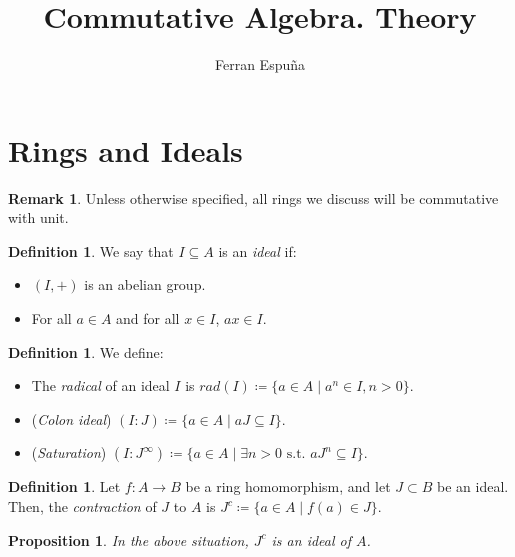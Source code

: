 \documentclass[11pt]{article}
\title{Commutative Algebra. Theory}
\author{Ferran Espuña}
\newtheorem{prop}[theorem]{Proposition}
\theoremstyle{definition}
\newtheorem{defn}[theorem]{Definition}
\newtheorem{rk}[theorem]{Remark}
\begin{document}
    \maketitle

    \section{Rings and Ideals}\label{sec:rings-and-ideals}

        \begin{rk}
            Unless otherwise specified, all rings we discuss will be commutative with unit.
        \end{rk}

        \begin{defn}
            We say that $I \subseteq A$ is an \emph{ideal} if:
            \begin{itemize}
                \item $(I,+)$ is an abelian group.
                \item For all $a \in A$ and for all $x\in I$, $ax \in I$.
            \end{itemize}
        \end{defn}

        \begin{defn}
            We define:
            \begin{itemize}
                \item The \emph{radical} of an ideal $I$ is $rad(I) \coloneqq \{a \in A \mid a^{n} \in I, n > 0\}$.
                \item (\emph{Colon ideal}) $(I:J) \coloneqq \{a \in A \mid aJ \subseteq I\}$.
                \item (\emph{Saturation}) $(I:J^{\infty}) \coloneqq \{a \in A \mid \exists n > 0 \text{ s.t. } a J^n \subseteq I\}$.
            \end{itemize}
        \end{defn}

        \begin{defn}
            Let $f: A \rightarrow B$ be a ring homomorphism, and let $J \subset B$ be an ideal.
            Then, the \emph{contraction} of $J$ to $A$ is $J^{c} \coloneqq \{a \in A \mid f(a) \in J\}$.
        \end{defn}

        \begin{prop}
            In the above situation, $J^{c}$ is an ideal of $A$.
        \end{prop}
\end{document}
